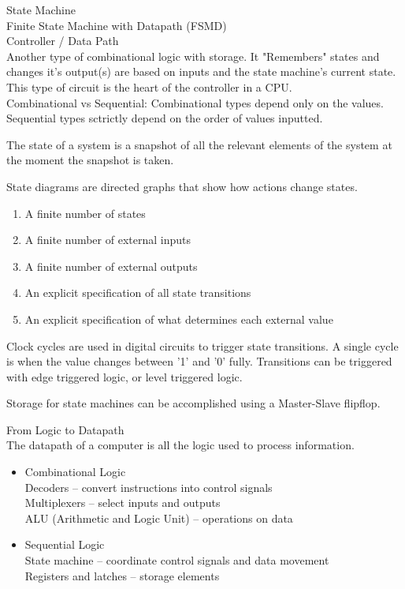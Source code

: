 \documentclass{article}
\begin{document}
\noindent
\Large
State Machine\\
\normalsize
\noindent
Finite State Machine with Datapath (FSMD)\\
Controller / Data Path\\
Another type of combinational logic with storage. It "Remembers" states and changes it's output(s) are based on inputs and the state machine's current state. This type of circuit is the heart of the controller in a CPU.\\

Combinational vs Sequential: Combinational types depend only on the values. Sequential types sctrictly depend on the order of values inputted.

The state of a system is a snapshot of all the relevant elements of the system at the moment the snapshot is taken.

State diagrams are directed graphs that show how actions change states.

\begin{enumerate}
  \item A finite number of states
  \item A finite number of external inputs
  \item A finite number of external outputs
  \item An explicit specification of all state transitions
  \item An explicit specification of what determines each external value
\end{enumerate}

Clock cycles are used in digital circuits to trigger state transitions. A single cycle is when the value changes between '1' and '0' fully. Transitions can be triggered with edge triggered logic, or level triggered logic.

Storage for state machines can be accomplished using a Master-Slave flipflop.

\noindent
\Large
From Logic to Datapath\\
\normalsize
\indent
The datapath of a computer is all the logic used to process information.
\begin{itemize}
  \item Combinational Logic\\
  Decoders -- convert instructions into control signals\\
  Multiplexers -- select inputs and outputs\\
  ALU (Arithmetic and Logic Unit) -- operations on data\\
  \item Sequential Logic\\
  State machine -- coordinate control signals and data movement\\
  Registers and latches -- storage elements\\
\end{itemize}
\end{document}
